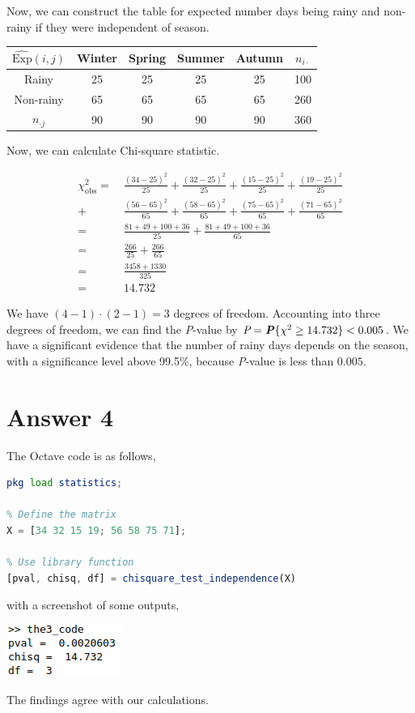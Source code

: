 \documentclass[12pt]{article}
\begin{document}
Now, we can construct the table for expected number days being rainy and
non-rainy if they were independent of season.

\begin{center}
\begin{tabular}{c|c c c c|c}
$\widehat{\text{Exp}}(i,j)$
              & Winter & Spring & Summer & Autumn & $n_{i \cdot}$ \\
\hline
Rainy         & 25 & 25 & 25 & 25 & 100 \\
Non-rainy     & 65 & 65 & 65 & 65 & 260 \\
\hline
$n_{\cdot j}$ & 90 & 90 & 90 & 90 & 360 \\
\end{tabular}
\end{center}

Now, we can calculate Chi-square statistic.

\begin{align*}
    \chi^2_\text{obs} =\ &\frac{(34-25)^2}{25} + \frac{(32-25)^2}{25}
                      +   \frac{(15-25)^2}{25} + \frac{(19-25)^2}{25} \\[0.75ex]
                      +\ &\frac{(56-65)^2}{65} + \frac{(58-65)^2}{65}
                      +   \frac{(75-65)^2}{65} + \frac{(71-65)^2}{65} \\[0.75ex]
    =\ &\frac{81+49+100+36}{25} + \frac{81+49+100+36}{65} \\[0.75ex]
    =\ &\frac{266}{25} + \frac{266}{65} \\[0.75ex]
    =\ &\frac{3458+1330}{325} \\[0.75ex]
    =\ &14.732
\end{align*}

We have $(4-1)\cdot(2-1) = 3$ degrees of freedom. Accounting into three degrees
of freedom, we can find the \textit{P}-value by $\textit{P} =
\textbf{\textit{P}}\{\chi^2 \geq 14.732\} < 0.005$. We have a significant
evidence that the number of rainy days depends on the season, with a
significance level above 99.5\%, because \textit{P}-value is less than $0.005$.

\section*{Answer 4}

\noindent
The Octave code is as follows,
\begin{lstlisting}[language=Octave]
% Load statistics module for chi-square independence test
pkg load statistics;

% Define the matrix
X = [34 32 15 19; 56 58 75 71];

% Use library function
[pval, chisq, df] = chisquare_test_independence(X)
\end{lstlisting}

\noindent
with a screenshot of some outputs,

\begin{center}
  \includegraphics[scale = 1]{the3_output.png}
\end{center}

The findings agree with our calculations.
\end{document}
